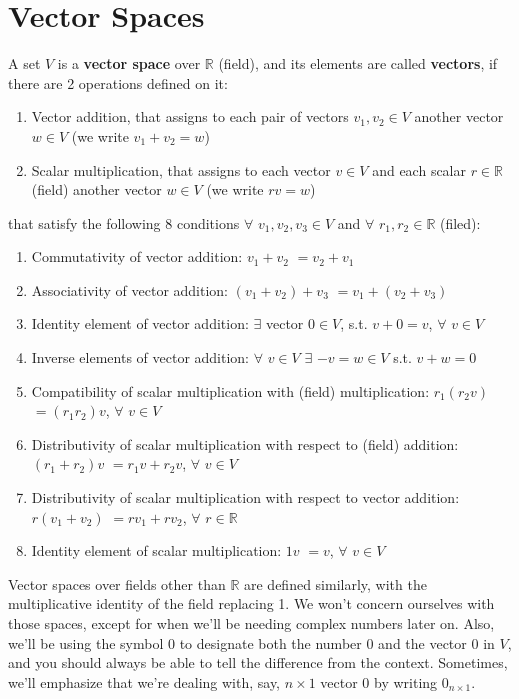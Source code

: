 \documentclass[12pt,oneside]{article}
\begin{document}
\section{Vector Spaces}
A set $V$ is a \textbf{vector space} over $\mathbb{R}$ (field), and its elements
are called \textbf{vectors}, if there are 2 operations defined on it:
\begin{enumerate}
\item Vector addition, that assigns to each pair of vectors $v_{1},
  v_{2} \in V$ another vector $w \in V$ (we write $v_{1} + v_{2} = w$)
\item Scalar multiplication, that assigns to each vector $v \in V$ and
  each scalar $r \in \mathbb{R}$ (field) another vector $w \in V$ (we write $r v
  = w$)
\end{enumerate}
that satisfy the following 8 conditions $\forall$ $ v_{1}, v_{2}, v_{3}
\in V$ and $\forall$ $r_{1}, r_{2} \in \mathbb{R}$ (filed):
\begin{enumerate}
\item Commutativity of vector addition: $v_{1} + v_{2}$ $= v_{2} + v_{1}$
\item Associativity of vector addition: $(v_{1} + v_{2}) + v_{3}$ $= v_{1} + (v_{2} + v_{3})$
\item Identity element of vector addition: $\exists$ vector $0 \in V$, s.t. $v + 0 = v$,  $\forall$ $v \in V$
\item Inverse elements of vector addition: $\forall$ $v \in V$ $\exists$ $-v = w \in V$ s.t. $v + w = 0$
\item Compatibility of scalar multiplication with (field) multiplication: $r_{1}(r_{2} v)$ $= (r_{1} r_{2})v$,  $\forall$ $v \in V$
\item Distributivity of scalar multiplication with respect to (field) addition: $(r_{1} + r_{2})v$ $= r_{1} v + r_{2} v$,  $\forall$ $v \in V$
\item Distributivity of scalar multiplication with respect to vector addition: $r (v_{1} + v_{2})$ $= r v_{1} + r v_{2}$,  $\forall$ $r \in
  \mathbb{R}$
\item Identity element of scalar multiplication: $1 v$ $= v$,  $\forall$ $v \in V$
\end{enumerate}

Vector spaces over fields other than $\mathbb{R}$ are defined similarly, with the multiplicative identity of the field replacing 1. We won't concern ourselves with those spaces, except for when we'll be needing complex numbers later on. Also, we'll be using the symbol $0$ to designate both the number $0$ and the vector $0$ in $V$, and you should always be able to tell the difference from the context. Sometimes, we'll emphasize that we're dealing with, say, $n \times 1$ vector $0$ by writing $0_{n \times 1}$. 
\end{document}
